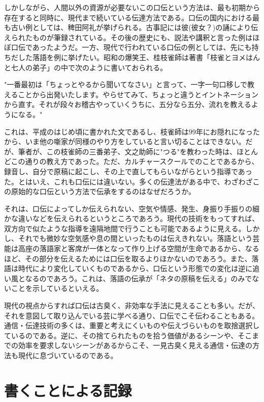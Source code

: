 しかしながら、人間以外の資源が必要ないこの口伝という方法は、最も初期から存在すると同時に、現代まで続いている伝達方法である。口伝の国内における最も古い例としては、稗田阿礼が挙げられる。古事記には彼(彼女？)の誦により伝えられたものが筆録されている。その後の歴史にも、説法や講釈と言った例はほぼ口伝であったようだ。一方、現代で行われている口伝の例としては、先にも持ちだした落語を例に挙げたい。昭和の爆笑王、桂枝雀師は著書「枝雀とヨメはんと七人の弟子」の中で次のように書いておられる。

"一番最初は「ちょっとやるから聞いてなさい」と言って、一字一句口移しで教えることから出発いたします。やらせてみて、ちょっと違うとイントネーションから直す。それが段々お稽古やっていくうちに、五分なら五分、流れを教えるようになる。"

これは、平成のはじめ頃に書かれた文であるし、枝雀師は99年にお隠れになったから、いま他の噺家が同様のやり方をしていると言い切ることはできない。だが、筆者が、この枝雀師の三番弟子、文之助師に"つる"を教わった時は、ほとんどこの通りの教え方であった。ただ、カルチャースクールでのことであるから、録音し、自分で原稿に起こし、その上で直してもらいながらという指導であった。とはいえ、これも口伝には違いない。多くの伝達法がある中で、わざわざこの原始的な口伝という方法で伝承をするのはなぜだろうか。

それは、口伝によってしか伝えられない、空気や情感、発生、身振り手振りの細かな違いなどを伝えられるというところであろう。現代の技術をもってすれば、双方向で似たような指導を遠隔地間で行うことも可能であるように見える。しかし、それでも微妙な空気感や息の間といったものは伝えきれない。落語という芸能は高座の落語家と客席が一体となって作り上げる空間が生命であるから、なるほど、その部分を伝えるためには口伝を取るよりほかないのであろう。また、落語は時代により変化していくものであるから、口伝という形態での変化は逆に追い風となるのであろう。これは、落語の伝承が「ネタの原稿を伝える」のみでないことを示しているといえる。

現代の視点からすれば口伝は古臭く、非効率な手法に見えることも多い。だが、それを意図して取り込んでいる芸に学べる通り、口伝でこそ伝わることもある。通信・伝達技術の多くは、重要と考えにくいものや伝えづらいものを取捨選択しているのである。逆に、その捨てられたものを拾う価値があるシーンや、そこまでの効率を要求しないシーンがあるからこそ、一見古臭く見える通信・伝達の方法も現代に息づいているのである。

\section{書くことによる記録}

